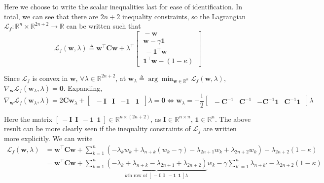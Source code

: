 \documentclass{article}
\numberwithin{equation}{section}
\begin{document}
Here we choose to write the scalar inequalities last for ease of
identification. In total, we can see that there are $ 2n + 2 $ inequality
constraints, so the Lagrangian $ \mathcal{L}_f : \mathbb{R}^n \times
\mathbb{R}^{2n + 2} \rightarrow \mathbb{R} $ can be written such that
\begin{equation*}
    \mathcal{L}_f(\mathbf{w}, \lambda) \triangleq \mathbf{w}^\top\mathbf{Cw} +
        \lambda^\top\begin{bmatrix}
            \ -\mathbf{w} \ \\
            \ \mathbf{w} - \gamma\mathbf{1} \\ \
            \ -\mathbf{1}^\top\mathbf{w} \ \\
            \ \mathbf{1}^\top\mathbf{w} - (1 - \kappa) \
        \end{bmatrix}
\end{equation*}

Since $ \mathcal{L}_f $ is convex in $ \mathbf{w} $, $ \forall \lambda \in
\mathbb{R}^{2n + 2} $, at $ \mathbf{w}_\lambda \triangleq
\arg\min_{\mathbf{w} \in\mathbb{R}^n}\mathcal{L}_f(\mathbf{w}, \lambda) $,
$ \nabla_\mathbf{w}\mathcal{L}_f(\mathbf{w}_\lambda, \lambda) = \mathbf{0} $. Expanding,
\begin{equation} \label{p2.3_wlambda}
    \nabla_\mathbf{w}\mathcal{L}_f(\mathbf{w}_\lambda, \lambda) =
    2\mathbf{Cw}_\lambda + \begin{bmatrix}
        \ -\mathbf{I} & \mathbf{I} & -\mathbf{1} & \mathbf{1} \
    \end{bmatrix}\lambda = \mathbf{0} \Leftrightarrow
    \mathbf{w}_\lambda = -\frac{1}{2}\begin{bmatrix}
        \ -\mathbf{C}^{-1} & \mathbf{C}^{-1} & -\mathbf{C}^{-1}\mathbf{1} &
        \mathbf{C}^{-1}\mathbf{1} \
    \end{bmatrix}\lambda
\end{equation}

Here the matrix $ [ \ -\mathbf{I} \ \ \mathbf{I} \ \ -\mathbf{1} \ \
\mathbf{1} \ ] \in \mathbb{R}^{n \times (2n + 2)} $, as $ \mathbf{I} \in
\mathbb{R}^{n \times n} $, $ \mathbf{1} \in \mathbb{R}^n $. The above result
can be more clearly seen if the inequality constraints of $ \mathcal{L}_f $
are written more explicitly. We can write
\begin{equation*}
    \begin{split}
    \mathcal{L}_f(\mathbf{w}, \lambda) & = \mathbf{w}^\top\mathbf{Cw} +
    \sum_{k = 1}^n(
        -\lambda_kw_k + \lambda_{n + k}(w_k - \gamma) - \lambda_{2n + 1}w_k +
        \lambda_{2n + 2}w_k
    ) - \lambda_{2n + 2}(1 - \kappa) \\ & =
    \mathbf{w}^\top\mathbf{Cw} + \sum_{k = 1}^n\underbrace{
        (-\lambda_k + \lambda_{n + k} - \lambda_{2n + 1} + \lambda_{2n + 2})
    }_{
        k\text{th row of } [
            \ -\mathbf{I} \ \ \mathbf{I} \ \ -\mathbf{1} \ \ \mathbf{1} \
        ]\lambda
    }w_k - \gamma\sum_{k' = 1}^n\lambda_{n + k'} - \lambda_{2n + 2}(1 - \kappa)
    \end{split}
\end{equation*}
\end{document}
